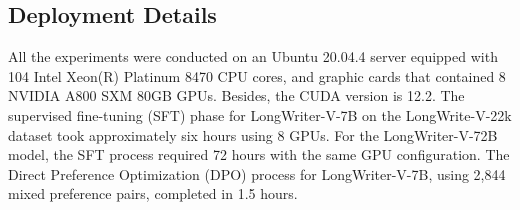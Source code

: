 \subsection{Deployment Details}
All the experiments were conducted on an Ubuntu 20.04.4 server equipped with 104 Intel Xeon(R) Platinum 8470 CPU cores, and graphic cards that contained 8 NVIDIA
A800 SXM 80GB GPUs. Besides, the CUDA version is 12.2. 
The supervised fine-tuning (SFT) phase for LongWriter-V-7B on the LongWrite-V-22k dataset took approximately six hours using 8 GPUs. For the LongWriter-V-72B model, the SFT process required 72 hours with the same GPU configuration. The Direct Preference Optimization (DPO) process for LongWriter-V-7B, using 2,844 mixed preference pairs, completed in 1.5 hours.



